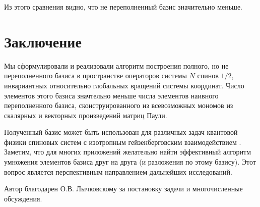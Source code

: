 \documentclass[]{article}
\renewcommand{\[}{\begin{equation}}
\renewcommand{\]}{\end{equation}}
\begin{document}
\bigskip

%
\noindent Из этого сравнения видно, что не переполненный базис значительно меньше.

\section{Заключение}
Мы сформулировали и реализовали алгоритм построения полного, но не переполненного базиса в пространстве операторов системы $N$ спинов $1/2$, инвариантных относительно глобальных вращений системы координат.  Число элементов этого базиса значтельно меньше числа элементов наивного переполненного базиса, сконструированного из всевозможных мономов из скалярных и векторных произведений матриц Паули.

Полученный базис может быть использован для различных задач квантовой физики спиновых систем с изотропным гейзенберговским взаимодействием \cite{USH,variational,kvadro,basisF}.  Заметим, что для многих приложений желательно найти эффективный алгоритм умножения элементов базиса друг на друга (и разложения по этому базису). Этот вопрос является перспективным направлением дальнейших исследований.

\bigskip
{} Автор благодарен О.В. Лычковскому за постановку задачи и многочисленные обсуждения. 

\vfill
\end{document}
